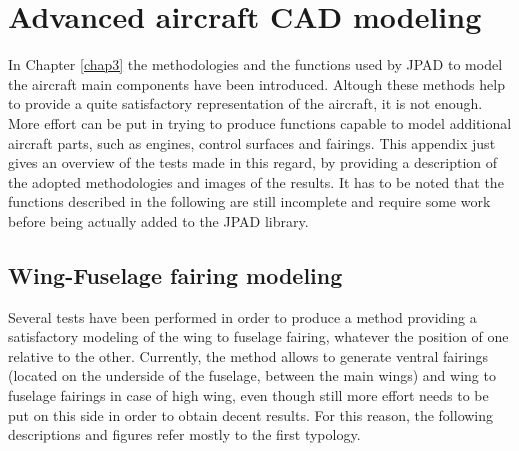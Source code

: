 \chapter{Advanced aircraft CAD modeling}
\label{chapApp1}

In Chapter \ref{chap3} the methodologies and the functions used by \gls{JPAD} to model the aircraft main components have been introduced. Altough these methods help to provide a quite satisfactory representation of the aircraft, it is not enough. More effort can be put in trying to produce functions capable to model additional aircraft parts, such as engines, control surfaces and fairings. This appendix just gives an overview of the tests made in this regard, by providing a description of the adopted methodologies and images of the results. It has to be noted that the functions described in the following are still incomplete and require some work before being actually added to the \gls{JPAD} library.

\section{Wing-Fuselage fairing modeling}
\label{secApp1A1}

Several tests have been performed in order to produce a method providing a satisfactory modeling of the wing to fuselage fairing, whatever the position of one relative to the other. Currently, the method allows to generate ventral fairings (located on the underside of the fuselage, between the main wings) and wing to fuselage fairings in case of high wing, even though still more effort needs to be put on this side in order to obtain decent results. For this reason, the following descriptions and figures refer mostly to the first typology. 

